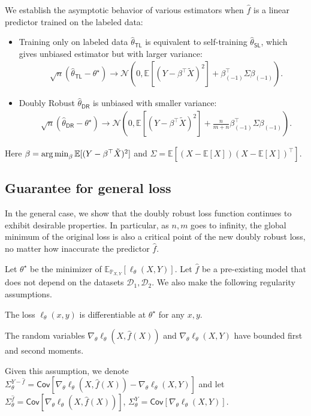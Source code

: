  \begin{proposition}\label{prop:mean_semi}
We establish the asymptotic behavior of various estimators when   $\hat f$  is a linear predictor trained on the labeled data:
\begin{itemize}
\item Training only on labeled data $\hat \theta_{\mathsf{TL}}$ is equivalent to self-training $\hat\theta_{\mathsf{SL}}$, which gives unbiased estimator but with larger variance:
\begin{align*}
    & \sqrt{n}(\hat \theta_{\mathsf{TL}} - \theta^\star) \rightarrow \mathcal{N}(0, \mathbb{E}[(Y-\beta^\top \tilde X)^2] + \beta_{(-1)}^\top \Sigma\beta_{(-1)}).
\end{align*}

\item Doubly Robust  $\hat \theta_{\mathsf{DR}}$ is unbiased with smaller variance:
\begin{align*}
    &\sqrt{n}(\hat \theta_{\mathsf{DR}} - \theta^\star) \rightarrow \mathcal{N}(0,  \mathbb{E}[(Y-\beta^\top \tilde X)^2] + \frac{n}{m+n} \beta_{(-1)}^\top \Sigma \beta_{(-1)}).
\end{align*}
\end{itemize}
Here $\beta = \operatorname*{arg\,min}_{\beta} \mathbb{E}[(Y-\beta^\top \tilde X)^2]$ and  $\Sigma = \mathbb{E}[(X-\mathbb{E}[X])(X-\mathbb{E}[X])^\top]$.
\end{proposition}

\subsection{Guarantee for general loss} 
In the general case, 
we  show that the doubly robust loss function continues to exhibit desirable properties. In particular,  as $n,m$ goes to infinity, the global minimum of the original loss is also a critical point of the new doubly robust loss, no matter how inaccurate the predictor $\hat f$.  

Let $\theta^\star$ be the minimizer of $\mathbb{E}_{\mathbb{P}_{X, Y}}[\ell_\theta(X, Y)]$. Let $\hat f$ be a pre-existing model that does not depend on the datasets $\mathcal{D}_1, \mathcal{D}_2$. 
We also make the following regularity assumptions.
\begin{assumption}\label{ass:diff}
The loss $\ell_\theta(x, y)$ is  differentiable at $\theta^\star$ for any $x, y$.
\end{assumption}
\begin{assumption}\label{ass:mom}
The random variables $\nabla_\theta \ell_\theta(X, \hat f(X)) $ and  $\nabla_\theta \ell_\theta(X, Y)$ have bounded first and second moments.  
\end{assumption}
Given this assumption, we denote $\Sigma_{\theta}^{Y-\hat f} = \mathsf{Cov}[\nabla_\theta \ell_\theta(X, \hat f(X)) - \nabla_\theta \ell_\theta(X, Y)]$ and let $\Sigma_{\theta}^{\hat f} = \mathsf{Cov}[\nabla_\theta \ell_\theta(X, \hat f(X))]$, $\Sigma_{\theta}^{Y} = \mathsf{Cov}[\nabla_\theta \ell_\theta(X, Y)]$. 
 
